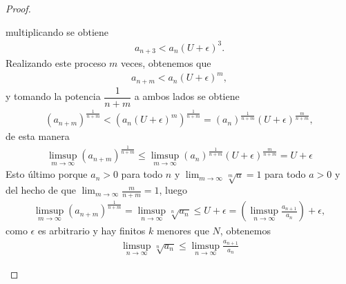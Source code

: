 \begin{itemize}[leftmargin=*]
\begin{proof}
\begin{itemize}
        multiplicando se obtiene
        \begin{align*}
            a_{n+3}<a_n(U+\epsilon)^3.
        \end{align*}
        Realizando este proceso $m$ veces, obtenemos que
        \begin{align*}
            a_{n+m}<a_n(U+\epsilon)^m,
        \end{align*}
        y tomando la potencia $\dfrac{1}{n+m}$ a ambos lados se obtiene
        \begin{align*}
            (a_{n+m})^{\frac{1}{n+m}}<\left(a_n(U+\epsilon)^m\right)^{\frac{1}{n+m}}=(a_n)^{\frac{1}{n+m}}(U+\epsilon)^{\frac{m}{n+m}},
        \end{align*}
        de esta manera
        \begin{align*}
            \limsup_{m\to \infty} \left(a_{n+m}\right)^{\frac{1}{n+m}}\leq \limsup_{m\to \infty}(a_n)^{\frac{1}{n+m}}(U+\epsilon)^{\frac{m}{n+m}}=U+\epsilon
        \end{align*}
        Esto último porque $a_n>0$ para todo $n$ y $\displaystyle \lim_{m\to \infty}\sqrt[m]{a}=1$ para todo $a>0$ y del hecho de que $\displaystyle \lim_{m\to \infty}\frac{m}{n+m}=1$, luego
        \begin{align*}
            \limsup_{m\to \infty}(a_{n+m})^{\frac{1}{n+m}}=\limsup_{n\to \infty}\sqrt[n]{a_n}\leq U+\epsilon=\left(\limsup_{n\to \infty} \frac{a_{n+1}}{a_n}\right)+\epsilon,
        \end{align*}
        como $\epsilon$ es arbitrario y hay finitos $k$ menores que $N$, obtenemos
        \begin{align*}
            \limsup_{n\to \infty}\sqrt[n]{a_n}\leq \limsup_{n\to \infty} \frac{a_{n+1}}{a_n}
        \end{align*}


\end{itemize}
\end{proof}
\end{itemize}
